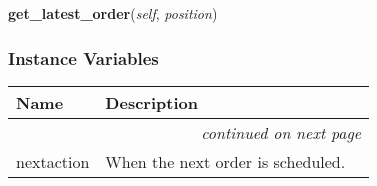     \vspace{0.5ex}

\hspace{.8\funcindent}\begin{boxedminipage}{\funcwidth}

    \raggedright \textbf{get\_latest\_order}(\textit{self}, \textit{position})

\setlength{\parskip}{2ex}
\setlength{\parskip}{1ex}
    \end{boxedminipage}



  \subsubsection{Instance Variables}

    \vspace{-1cm}
\hspace{\varindent}\begin{longtable}{|p{\varnamewidth}|p{\vardescrwidth}|l}
\cline{1-2}
\cline{1-2} \centering \textbf{Name} & \centering \textbf{Description}& \\
\cline{1-2}
\endhead\cline{1-2}\multicolumn{3}{r}{\small\textit{continued on next page}}\\\endfoot\cline{1-2}
\endlastfoot\raggedright n\-e\-x\-t\-a\-c\-t\-i\-o\-n\- & When the next order is scheduled.&\\
\cline{1-2}
\end{longtable}

